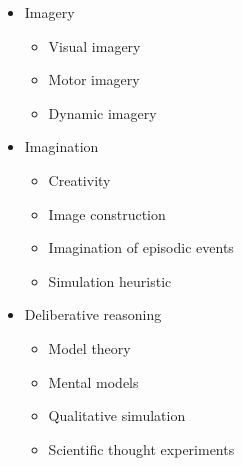 \documentclass[12pt]{article}
\begin{document}
\begin{itemize}
\item Imagery
    \begin{itemize}
    \item Visual imagery \citep{Kosslyn2006,Kosslyn1988,Shepard1971}
    \item Motor imagery \citep{Parsons1994}
    \item Dynamic imagery \citep{Schwartz1999a,Flusberg2011}
    \end{itemize}
\item Imagination
    \begin{itemize}
    \item Creativity \citep{Finke1988}
    \item Image construction \citep{Kosslyn1988}
    \item Imagination of episodic events \citep{Schacter2012}
    \item Simulation heuristic \citep{Kahneman1981}
    \end{itemize}
\item Deliberative reasoning
    \begin{itemize}
    \item Model theory \citep{Johnson-Laird2012,Khemlani2013}
    \item Mental models \citep{Craik1943,Gentner1983,Hegarty2004}
    \item Qualitative simulation \citep{Kuipers1986,Forbus2011}
    \item Scientific thought experiments \citep{Gendler1998,Trickett2007,Clement2009,Brown2014}
    \end{itemize}
\end{itemize}

\end{document}
